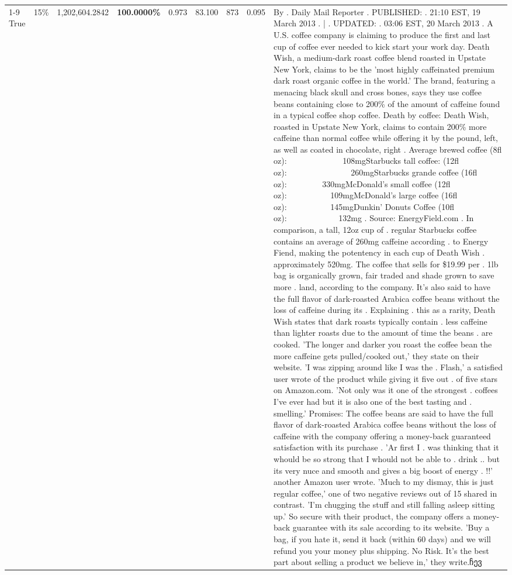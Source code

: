 \begin{table}[H]
{\begin{tabular}{lllrlllll}
\cline{1-9} \cline{2-9}
True & 15\% & 1,202,604.2842 & \bfseries \color{red} 100.0000\% & 0.973 & 83.100 & 873 & 0.095 & By . Daily Mail Reporter . PUBLISHED: . 21:10 EST, 19 March 2013 . | . UPDATED: . 03:06 EST, 20 March 2013 . A U.S. coffee company is claiming to produce the first and last cup of coffee ever needed to kick start your work day. Death Wish, a medium-dark roast coffee blend roasted in Upstate New York, claims to be the 'most highly caffeinated premium dark roast organic coffee in the world.' The brand, featuring a menacing black skull and cross bones, says they use coffee beans containing close to 200\% of the amount of caffeine found in a typical coffee shop coffee. Death by coffee: Death Wish, roasted in Upstate New York, claims to contain 200\% more caffeine than normal coffee while offering it by the pound, left, as well as coated in chocolate, right . Average brewed coffee (8fl oz):              108mgStarbucks tall coffee: (12fl oz):                260mgStarbucks grande coffee (16fl oz):         330mgMcDonald's small coffee (12fl oz):           109mgMcDonald's large coffee (16fl oz):           145mgDunkin' Donuts Coffee (10fl oz):             132mg . Source: EnergyField.com . In comparison, a tall, 12oz cup of . regular Starbucks coffee contains an average of 260mg caffeine according . to Energy Fiend, making the potentency in each cup of Death Wish . approximately 520mg. The coffee that sells for \$19.99 per . 1lb bag is organically grown, fair traded and shade grown to save more . land, according to the company. It's also said to have the full flavor of dark-roasted Arabica coffee beans without the loss of caffeine during its . Explaining . this as a rarity, Death Wish states that dark roasts typically contain . less caffeine than lighter roasts due to the amount of time the beans . are cooked. 'The longer and darker you roast the coffee bean the more caffeine gets pulled/cooked out,' they state on their website. 'I was zipping around like I was the . Flash,' a satisfied user wrote of the product while giving it five out . of five stars on Amazon.com. 'Not only was it one of the strongest . coffees I've ever had but it is also one of the best tasting and . smelling.’ Promises: The coffee beans are said to have the full flavor of dark-roasted Arabica coffee beans without the loss of caffeine with the company offering a money-back guaranteed satisfaction with its purchase . 'Ar first I . was thinking that it whould be so strong that I whould not be able to . drink .. but its very nuce and smooth and gives a big boost of energy . !!' another Amazon user wrote. 'Much to my dismay, this is just regular coffee,' one of two negative reviews out of 15 shared in contrast. 'I'm chugging the stuff and still falling asleep sitting up.' So secure with their product, the company offers a money-back guarantee with its sale according to its website. 'Buy a bag, if you hate it, send it back (within 60 days) and we will refund you your money plus shipping. No Risk. It’s the best part about selling a product we believe in,' they write.ჩევ \\

\end{tabular}}
\end{table}
